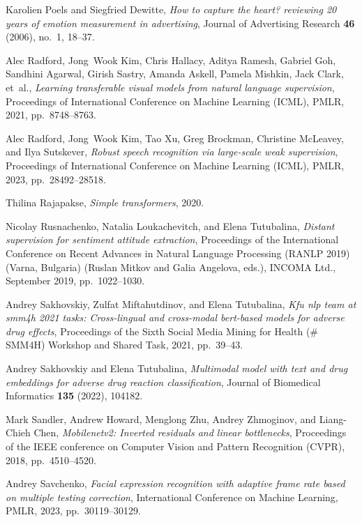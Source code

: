 \documentclass{zapiski}
\begin{document}
\begin{thebibliography}{10}
Karolien Poels and Siegfried Dewitte, \emph{How to capture the heart? reviewing
  20 years of emotion measurement in advertising}, Journal of Advertising
  Research \textbf{46} (2006), no.~1, 18--37.

Alec Radford, Jong~Wook Kim, Chris Hallacy, Aditya Ramesh, Gabriel Goh,
  Sandhini Agarwal, Girish Sastry, Amanda Askell, Pamela Mishkin, Jack Clark,
  et~al., \emph{Learning transferable visual models from natural language
  supervision}, Proceedings of International Conference on Machine Learning
  (ICML), PMLR, 2021, pp.~8748--8763.

Alec Radford, Jong~Wook Kim, Tao Xu, Greg Brockman, Christine McLeavey, and
  Ilya Sutskever, \emph{Robust speech recognition via large-scale weak
  supervision}, Proceedings of International Conference on Machine Learning
  (ICML), PMLR, 2023, pp.~28492--28518.

Thilina Rajapakse, \emph{Simple transformers}, 2020.

Nicolay Rusnachenko, Natalia Loukachevitch, and Elena Tutubalina, \emph{Distant
  supervision for sentiment attitude extraction}, Proceedings of the
  International Conference on Recent Advances in Natural Language Processing
  (RANLP 2019) (Varna, Bulgaria) (Ruslan Mitkov and Galia Angelova, eds.),
  INCOMA Ltd., September 2019, pp.~1022--1030.

Andrey Sakhovskiy, Zulfat Miftahutdinov, and Elena Tutubalina, \emph{Kfu nlp
  team at smm4h 2021 tasks: Cross-lingual and cross-modal bert-based models for
  adverse drug effects}, Proceedings of the Sixth Social Media Mining for
  Health (\# SMM4H) Workshop and Shared Task, 2021, pp.~39--43.

Andrey Sakhovskiy and Elena Tutubalina, \emph{Multimodal model with text and
  drug embeddings for adverse drug reaction classification}, Journal of
  Biomedical Informatics \textbf{135} (2022), 104182.

Mark Sandler, Andrew Howard, Menglong Zhu, Andrey Zhmoginov, and Liang-Chieh
  Chen, \emph{Mobilenetv2: Inverted residuals and linear bottlenecks},
  Proceedings of the IEEE conference on Computer Vision and Pattern Recognition
  (CVPR), 2018, pp.~4510--4520.

Andrey Savchenko, \emph{Facial expression recognition with adaptive frame rate
  based on multiple testing correction}, International Conference on Machine
  Learning, PMLR, 2023, pp.~30119--30129.


\end{thebibliography}
\end{document}
